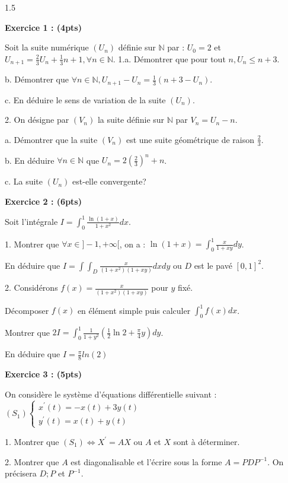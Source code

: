 \documentclass[12pt]{article}
\begin{document}
\begin{spacing}{1.5}

\textbf{Exercice 1 : (4pts)}

Soit la suite numérique $(U_n)$ définie sur $\mathbb{N}$ par : $U_0 = 2$ et $U_{n+1} = \frac{2}{3}U_n + \frac{1}{3}n + 1, \forall {n\in \mathbb{N}}$.
1.a. Démontrer que pour tout $n, U_n\leq n+3$.

b. Démontrer que $\forall {n\in \mathbb{N}}, U_{n+1} - U_n = \frac{1}{3}(n+3-U_n)$.

c. En déduire le sens de variation de la suite $(U_n)$.

2. On désigne par $(V_n)$ la suite définie sur $\mathbb{N}$ par $V_n =U_n-n$.

a. Démontrer que la suite $(V_n)$ est une suite géométrique de raison $\frac{2}{3}$.

b. En déduire $\forall {n\in \mathbb{N}}$ que $U_n = 2(\frac{2}{3})^n + n$.

c. La suite $(U_n)$ est-elle convergente?

\textbf{Exercice 2 : (6pts)}

Soit l'intégrale $I=\int_{0}^{1}\frac{\ln(1 + x)}{1 + x^2}dx$.

1. Montrer que $\forall {x\in ]-1,+\infty[}$, on a : $\ln(1+x) = \int_{0}^{1}\frac{x}{1 + xy}dy$.

En déduire que $I = \int\int_D\frac{x}{(1+x^2)(1+xy)}dxdy$ ou  $D$ est le pavé $[0,1]^2$.

2. Considérons $f(x)= \frac{x}{(1+x^2)(1+xy)}$ pour $y$ fixé.

Décomposer $f(x)$ en élément simple puis calculer $\int_{0}^{1}f(x)dx$.

Montrer que $2I = \int_{0}^{1}\frac{1}{1+y^2}\left(\frac{1}{2}\ln2 + \frac{\pi}{4}y\right)dy$.

En déduire que $I=\frac{\pi}{8}ln(2)$

\medskip
\textbf{Exercice 3 : (5pts)}

On considère le système d'équations différentielle suivant :  $(S_1)\begin{cases}
x^{\prime}(t)=-x(t) + 3 y(t)\\
y^{\prime}(t)=x(t) + y(t)
\end{cases}$

1. Montrer que $(S_1)\Longleftrightarrow X^{\prime} = AX$ ou $A$ et $X$ sont à déterminer.

2. Montrer que $A$ est diagonalisable et l'écrire sous la forme $A=PDP^{-1}$. On précisera $D; P$ et $P^{-1}$.


\end{spacing}
\end{document}
